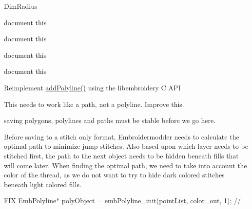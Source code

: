 \begin{DoxyRefList}
Dim\+Radius  
\item[Member \mbox{\hyperlink{classPropertyEditor_af77a9b50a881ba48136c67f40c274e1e}{Property\+Editor\+::create\+Combo\+Box\+Selected}} ()]\label{todo__todo000024}%
%
document this  
\item[Member \mbox{\hyperlink{classPropertyEditor_a25880d96f0b4466fc4342255adaa7022}{Property\+Editor\+::create\+Tool\+Button\+QSelect}} ()]\label{todo__todo000025}%
%
document this  
\item[Member \mbox{\hyperlink{classPropertyEditor_ad7452c5931d2f0c7f63a308d1ccccfc7}{Property\+Editor\+::event\+Filter}} (QObject $\ast$obj, QEvent $\ast$event)]\label{todo__todo000023}%
%
document this  
\item[Member \mbox{\hyperlink{classPropertyEditor_a4bca2abc45a97402b7135f7b8407d125}{Property\+Editor\+::$\sim$\+Property\+Editor}} ()]\label{todo__todo000022}%
%
document this  
\item[Member \mbox{\hyperlink{classSaveObject_ae11f893d999e959825a7ee160b269e51}{Save\+Object\+::add\+Path}} (Emb\+Pattern $\ast$pattern, QGraphics\+Item $\ast$item)]\label{todo__todo000015}%
%
Reimplement \mbox{\hyperlink{classSaveObject_ace37a0a25fcffac8075e6814ed54255a}{add\+Polyline()}} using the libembroidery C API  
\item[Member \mbox{\hyperlink{classSaveObject_afb37e4cd771449c65d3023d2e51bf40a}{Save\+Object\+::add\+Text\+Single}} (Emb\+Pattern $\ast$pattern, QGraphics\+Item $\ast$item)]\label{todo__todo000017}%
%
This needs to work like a path, not a polyline. Improve this. 

\label{todo__todo000016}%
%
saving polygons, polylines and paths must be stable before we go here. 
\item[Member \mbox{\hyperlink{classSaveObject_a450a41fe8347cc65b1c72caeeab38e67}{Save\+Object\+::save}} (QString file\+Name)]\label{todo__todo000014}%
%
Before saving to a stitch only format, Embroidermodder needs to calculate the optimal path to minimize jump stitches. Also based upon which layer needs to be stitched first, the path to the next object needs to be hidden beneath fills that will come later. When finding the optimal path, we need to take into account the color of the thread, as we do not want to try to hide dark colored stitches beneath light colored fills.  
\item[Member \mbox{\hyperlink{classSaveObject_a0d041d54c0440f2ea8393c67df3c25a9}{Save\+Object\+::to\+Polyline}} (Emb\+Pattern $\ast$pattern, const QPointF \&obj\+Pos, const QPainter\+Path \&obj\+Path, QString layer, const QColor \&color, QString line\+Type, QString line\+Weight)]\label{todo__todo000018}%
%
FIX Emb\+Polyline$\ast$ poly\+Object = emb\+Polyline\+\_\+init(point\+List, color\+\_\+out, 1); //


\end{DoxyRefList}
